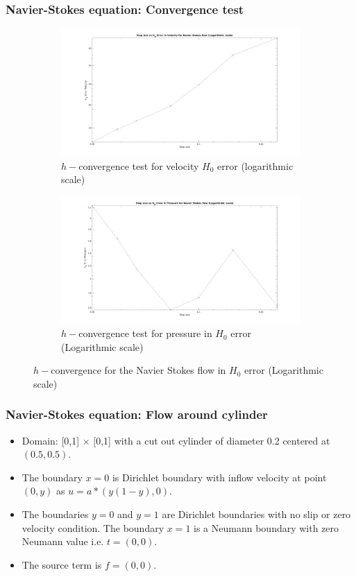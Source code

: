 \documentclass{beamer}
\begin{document}
\begin{frame}
\frametitle{Navier-Stokes equation: Convergence test}
\begin{figure}
\begin{subfigure}{0.4\textwidth}	
  \includegraphics[width=\linewidth]{H0_convergence_velocity_n_s_log.jpg}
  \caption{$h-$convergence test for velocity $H_0$ error (logarithmic scale)}
  \label{fig:vel_navier_stoke_conv_log_h0}
\end{subfigure}
\begin{subfigure}{0.4\textwidth}	
  \includegraphics[width=\linewidth]{H0_convergence_pressure_n_s_log.jpg}
  \caption{$h-$convergence test for pressure in $H_0$ error (Logarithmic scale)}
  \label{fig:pre_navier_stoke_conv_log_h0}
\end{subfigure}
\caption{$h-$convergence for the Navier Stokes flow in $H_0$ error (Logarithmic scale)}
\label{navier_stoke_conv_h0_log}
\end{figure}
\end{frame}
\begin{frame}
\frametitle{Navier-Stokes equation: Flow around cylinder}
\begin{itemize}
\item Domain: [0,1] $\times$ [0,1] with a cut out cylinder of diameter 0.2 centered at $(0.5,0.5)$.
\item The boundary ${x=0}$ is Dirichlet boundary with inflow velocity at point $(0,y)$ as $u = a*(y(1-y), 0)$. 
\item The boundaries ${y = 0}$ and ${y = 1}$ are Dirichlet boundaries with no slip or zero velocity condition. The boundary ${x = 1}$ is a Neumann boundary with zero Neumann value i.e. $t = (0, 0)$. 
\item The source term is $f = (0, 0)$.
\end{itemize}
\end{frame}
\end{document}
